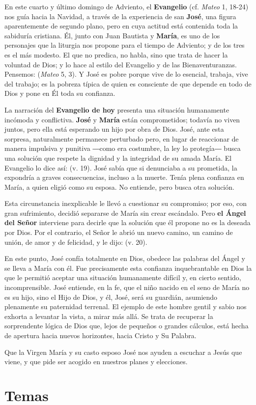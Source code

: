 				\begin{body}
					En este cuarto y último domingo de Adviento, el \textbf{Evangelio} (cf. \emph{Mateo} 1, 18-24) nos guía hacia la Navidad, a través de la experiencia de san \textbf{José}, una figura aparentemente de segundo plano, pero en cuya actitud está contenida toda la sabiduría cristiana. Él, junto con Juan Bautista y \textbf{María}, es uno de los personajes que la liturgia nos propone para el tiempo de Adviento; y de los tres es el más modesto. El que no predica, no habla, sino que trata de hacer la voluntad de Dios; y lo hace al estilo del Evangelio y de las Bienaventuranzas. Pensemos:  (\emph{Mateo} 5, 3). Y José es pobre porque vive de lo esencial, trabaja, vive del trabajo; es la pobreza típica de quien es consciente de que depende en todo de Dios y pone en Él toda su confianza.
					
					La narración del \textbf{Evangelio de hoy} presenta una situación humanamente incómoda y conflictiva. \textbf{José} y \textbf{María} están comprometidos; todavía no viven juntos, pero ella está esperando un hijo por obra de Dios. José, ante esta sorpresa, naturalmente permanece perturbado pero, en lugar de reaccionar de manera impulsiva y punitiva ―como era costumbre, la ley lo protegía― busca una solución que respete la dignidad y la integridad de su amada María. El Evangelio lo dice así:  (v. 19). José sabía que si denunciaba a su prometida, la expondría a graves consecuencias, incluso a la muerte. Tenía plena confianza en María, a quien eligió como su esposa. No entiende, pero busca otra solución.
					
					Esta circunstancia inexplicable le llevó a cuestionar su compromiso; por eso, con gran sufrimiento, decidió separarse de María sin crear escándalo. Pero \textbf{el Ángel del Señor} interviene para decirle que la solución que él propone no es la deseada por Dios. Por el contrario, el Señor le abrió un nuevo camino, un camino de unión, de amor y de felicidad, y le dijo:  (v. 20).
					
					En este punto, José confía totalmente en Dios, obedece las palabras del Ángel y se lleva a María con él. Fue precisamente esta confianza inquebrantable en Dios la que le permitió aceptar una situación humanamente difícil y, en cierto sentido, incomprensible. José entiende, en la fe, que el niño nacido en el seno de María no es su hijo, sino el Hijo de Dios, y él, José, será su guardián, asumiendo plenamente su paternidad terrenal. El ejemplo de este hombre gentil y sabio nos exhorta a levantar la vista, a mirar más allá. Se trata de recuperar la sorprendente lógica de Dios que, lejos de pequeños o grandes cálculos, está hecha de apertura hacia nuevos horizontes, hacia Cristo y Su Palabra.
					
					Que la Virgen María y su casto esposo José nos ayuden a escuchar a Jesús que viene, y que pide ser acogido en nuestros planes y elecciones.
				\end{body}
			
\newsection

	\section{Temas}
	
		